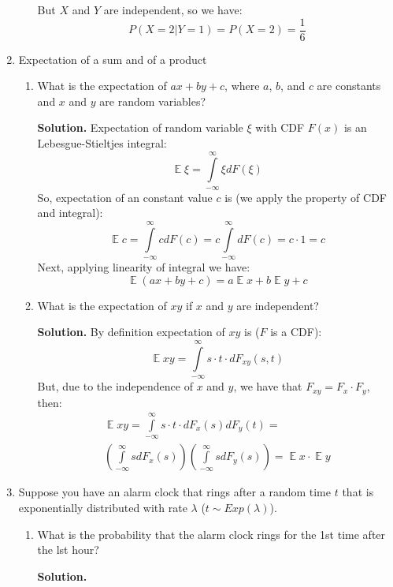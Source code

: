 \documentclass[a4paper, 12pt]{article}
\DeclareMathOperator{\E}{\mathbb{E}}
\newcommand{\rbra}[1]{\left( #1 \right)}
\newcommand{\task}[2]{
    \item #1

    \textbf{Solution. } #2
}
\begin{document}
\begin{enumerate}
\begin{enumerate}
{\[                  \]
                  But $X$ and $Y$ are independent, so we have:
                  \[
                      P(X=2 | Y=1) = P(X=2) = \frac{1}{6}
                  \]
              }
          \end{enumerate}
    \item Expectation of a sum and of a product
          \begin{enumerate}
              \task{What is the expectation of $ax + by+c$, where $a$, $b$, and $c$ are constants and $x$ and $y$ are
                  random variables?}
              {Expectation of random variable $\xi$ with CDF $F(x)$ is an
                  Lebesgue-Stieltjes integral:
                  \[
                      \E \xi = \int\limits_{-\infty}^{\infty} \xi dF(\xi)
                  \]
                  So, expectation of an constant value $c$ is (we apply the property of CDF and integral):
                  \[
                      \E c = \int\limits_{-\infty}^{\infty} c dF(c) = c \int\limits_{-\infty}^{\infty} dF(c) = c \cdot 1 = c
                  \]
                  Next, applying linearity of integral we have:
                  \[
                      \E \rbra{ax + by + c} = a \E x + b \E y + c
                  \]
              }
              \task{What is the expectation of $xy$ if $x$ and $y$ are independent?}
              {
                  By definition expectation of $xy$ is ($F$ is a CDF):
                  \[
                      \E xy = \int\limits_{-\infty}^{\infty} s \cdot t \cdot dF_{xy}(s, t)
                  \]
                  But, due to the independence of $x$ and $y$, we have that
                  $F_{xy} = F_x \cdot F_y$, then:
                  \begin{multline*}
                      \E xy = \int\limits_{-\infty}^{\infty} s \cdot t \cdot dF_x(s) dF_y(t) = \\
                      \rbra{\int\limits_{-\infty}^{\infty} s dF_x(s)}
                      \rbra{\int\limits_{-\infty}^{\infty} s dF_y(s)} = \E x \cdot \E y
                  \end{multline*}
              }
          \end{enumerate}
    \item Suppose you have an alarm clock that rings after a random time $t$ that is exponentially
          distributed with rate $\lambda$ ($t \sim Exp(\lambda)$).
          \begin{enumerate}
              \task{What is the probability that the alarm clock rings for the 1st time after the lst hour?
}
\end{enumerate}
\end{enumerate}
\end{document}
